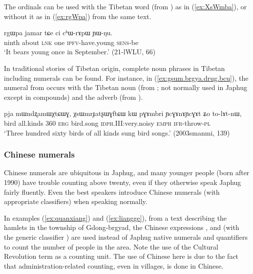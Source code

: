 The ordinals can be used with the Tibetan word  (from ) as in (\ref{ex:XsWmba}), or without it as in (\ref{ex:rgWpa}) from the same text.

\begin{exe}
\ex \label{ex:rgWpa}
 \gll  rgɯpa jamar tɕe ci cʰɯ-rɤpɯ ɲɯ-ŋu. \\
ninth about \textsc{lnk} one \textsc{ipfv}-have.young  \textsc{sens}-be \\
 \glt `It bears young once in September.' (21-lWLU, 66)
\end{exe}

In traditional stories of Tibetan origin, complete noun phrases in Tibetan including numerals can be found. For instance, in (\ref{ex:gsum.brgya.drug.bcu}), the numeral  from  occurs with the Tibetan noun   (from ; not normally used in Japhug except in compounds) and the adverb  (from ).

\begin{exe}
\ex \label{ex:gsum.brgya.drug.bcu}
 \gll pja mɯndʐamɯχtɕɯɣ, χsɯmrɟatʂɯɣftɕɯ kɯ pɣɤmbri ɲcɣɤnɤɲcɣɤt ʑo to-lɤt-nɯ, \\
 bird all.kinds 360 \textsc{erg} bird.song \textsc{idph}.III:very.noisy \textsc{emph} \textsc{ifr}-throw-\textsc{pl} \\
\glt `Three hundred sixty birds of all kinds sung bird songs.' (2003smanmi, 139)
\end{exe}

\subsubsection{Chinese numerals}  \label{sec:chinese.numerals}
Chinese numerals are ubiquitous in Japhug, and many younger people (born after 1990) have trouble counting above twenty, even if they otherwise speak Japhug fairly fluently. Even the best speakers introduce Chinese numerals (with appropriate classifiers) when speaking normally. 

In examples (\ref{ex:quanxiang}) and (\ref{ex:liangge}), from a text describing the hamlets in the township of Gdong-brgyad, the Chinese expressions ,  and  (with the generic classifier ) are used instead of Japhug native numerals and quantifiers to count the number of people in the area. Note the use of the Cultural Revolution term  as a counting unit. The use of Chinese here is due to the fact that administration-related counting, even in villages, is done in Chinese.

